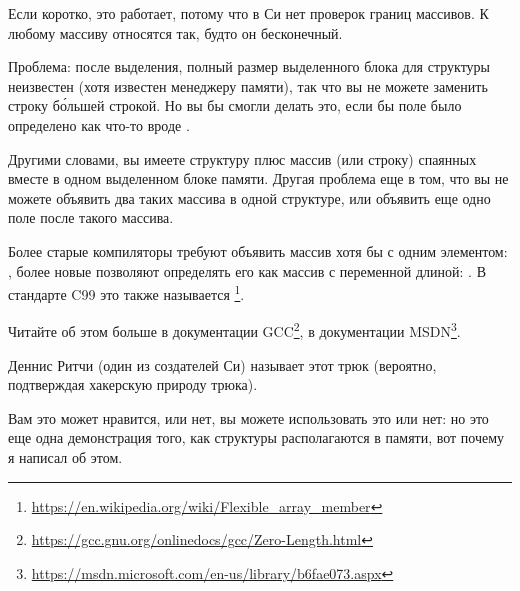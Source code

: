 Если коротко, это работает, потому что в Си нет проверок границ массивов. К любому массиву относятся так, будто он бесконечный.

Проблема: после выделения, полный размер выделенного блока для структуры неизвестен (хотя известен менеджеру памяти),
так что вы не можете заменить строку б\'{о}льшей строкой.
Но вы бы смогли делать это, если бы поле было определено как что-то вроде .

Другими словами, вы имеете структуру плюс массив (или строку) спаянных вместе в одном выделенном блоке памяти.
Другая проблема еще в том, что вы не можете объявить два таких массива в одной структуре, или объявить еще одно поле
после такого массива.

Более старые компиляторы требуют объявить массив хотя бы с одним элементом: , более новые позволяют
определять его как массив с переменной длиной: .
В стандарте C99 это также называется \footnote{\url{https://en.wikipedia.org/wiki/Flexible_array_member}}.

Читайте об этом больше в документации GCC\footnote{\url{https://gcc.gnu.org/onlinedocs/gcc/Zero-Length.html}},
в документации MSDN\footnote{\url{https://msdn.microsoft.com/en-us/library/b6fae073.aspx}}.

Деннис Ритчи (один из создателей Си) называет этот трюк  
(вероятно, подтверждая хакерскую природу трюка).

Вам это может нравится, или нет, вы можете использовать это или нет:
но это еще одна демонстрация того, как структуры располагаются в памяти, вот почему я написал об этом.

